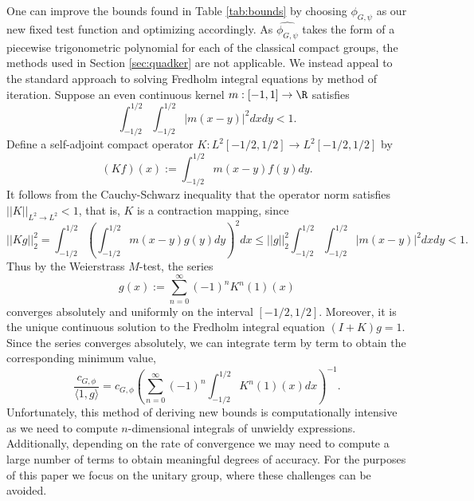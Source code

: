 One can improve the bounds found in Table \ref{tab:bounds} by choosing $\phi_{G, \psi}$ as our new fixed test function and optimizing accordingly. As $\widehat{\phi_{G, \psi}}$ takes the form of a piecewise trigonometric polynomial for each of the classical compact groups, the methods used in Section \ref{sec:quadker} are not applicable. We instead appeal to the standard approach to solving Fredholm integral equations by method of iteration. Suppose an even continuous kernel $m: [-1, 1] \to \R$ satisfies
	\begin{equation}
		\int_{-1/2}^{1/2} \int_{-1/2}^{1/2} |m(x - y)|^2 dx dy < 1. 
	\end{equation}
Define a self-adjoint compact operator $K: L^2 [-1/2, 1/2] \to L^2[-1/2, 1/2]$ by
	\begin{equation}
		(Kf)(x) := \int_{-1/2}^{1/2} m(x - y) f(y) dy.
	\end{equation}
It follows from the Cauchy-Schwarz inequality that the operator norm satisfies $||K||_{L^2 \to L^2} < 1$, that is, $K$ is a contraction mapping, since
	\begin{equation}
		||Kg||_2^2 = \int_{-1/2}^{1/2} \left( \int_{-1/2}^{1/2} m(x - y) g(y) dy \right)^2 dx \leq ||g||_2^2 \int_{-1/2}^{1/2} \int_{-1/2}^{1/2} |m(x - y)|^2 dx dy < 1. 
	\end{equation}	
Thus by the Weierstrass $M$-test, the series
	\begin{equation}
		g(x) := \sum_{n = 0}^\infty (-1)^n K^n (1)(x)
	\end{equation}
converges absolutely and uniformly on the interval $[-1/2, 1/2]$. Moreover, it is the unique continuous solution to the Fredholm integral equation $(I + K) g = 1$. Since the series converges absolutely, we can integrate term by term to obtain the corresponding minimum value,
	\begin{equation}
		\frac{c_{G, \phi}}{\langle 1, g \rangle} = c_{G, \phi}\left( \sum_{n = 0}^\infty (-1)^n \int_{-1/2}^{1/2} K^n (1) (x) dx \right)^{-1}. \label{eq:seriesmin}
	\end{equation}
Unfortunately, this method of deriving new bounds is computationally intensive as we need to compute $n$-dimensional integrals of unwieldy expressions. Additionally, depending on the rate of convergence we may need to compute a large number of terms to obtain meaningful degrees of accuracy. For the purposes of this paper we focus on the unitary group, where these challenges can be avoided. 

